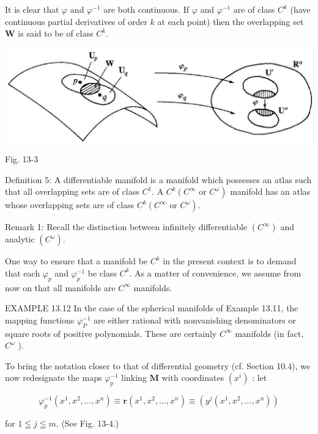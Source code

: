 \documentclass[10pt]{article}
\begin{document}
It is clear that $\varphi$ and $\varphi^{-1}$ are both continuous. If $\varphi$ and $\varphi^{-1}$ are of class $C^{k}$ (have continuous partial derivatives of order $k$ at each point) then the overlapping set $\mathbf{W}$ is said to be of class $C^{k}$.

\begin{center}
\includegraphics[max width=\textwidth]{2024_04_03_41f90be4f896e21f0dc9g-205(1)}
\end{center}

Fig. 13-3

Definition 5: A differentiable manifold is a manifold which possesses an atlas such that all overlapping sets are of class $C^{1}$. A $C^{k}\left(C^{\infty}\right.$ or $\left.C^{\omega}\right)$ manifold has an atlas whose overlapping sets are of class $C^{k}\left(C^{\infty}\right.$ or $\left.C^{\omega}\right)$.

Remark 1: Recall the distinction between infinitely differentiable $\left(C^{\infty}\right)$ and analytic $\left(C^{\omega}\right)$.

One way to ensure that a manifold be $C^{k}$ in the present context is to demand that each $\varphi_{p}$ and $\varphi_{p}^{-1}$ be class $C^{k}$. As a matter of convenience, we assume from now on that all manifolds are $C^{\infty}$ manifolds.

EXAMPLE 13.12 In the case of the spherical manifolds of Example 13.11, the mapping functions $\varphi_{P}^{-1}$ are either rational with nonvanishing denominators or square roots of positive polynomials. These are certainly $C^{\infty}$ manifolds (in fact, $C^{\omega}$ ).

To bring the notation closer to that of differential geometry (cf. Section 10.4), we now redesignate the maps $\varphi_{p}^{-1}$ linking $\mathbf{M}$ with coordinates $\left(x^{i}\right)$ : let

$$
\varphi_{p}^{-1}\left(x^{1}, x^{2}, \ldots, x^{n}\right) \equiv \mathbf{r}\left(x^{1}, x^{2}, \ldots, x^{n}\right) \equiv\left(y^{j}\left(x^{1}, x^{2}, \ldots, x^{n}\right)\right)
$$

for $1 \leqq j \leqq m$. (See Fig. 13-4.)
\end{document}
